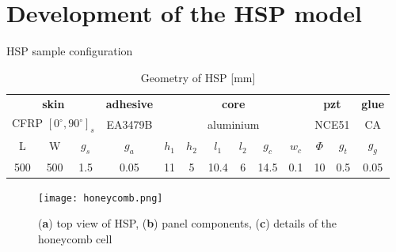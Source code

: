 \documentclass[10pt]{beamer} %
\begin{document}
\section{Development of the HSP model}
\begin{frame}[label=frame6]{HSP sample configuration}
\begin{table}
	\centering \footnotesize
	\caption{Geometry of HSP [mm]}
	\begin{tabular}{ccccccccccccc} 
		\toprule
		\multicolumn{3}{c}{\textbf{skin}} & {\textbf{adhesive}} & \multicolumn{6}{c}{\textbf{core}} & \multicolumn{2}{c}{\textbf{pzt}} & {\textbf{glue}}\\
		\multicolumn{3}{c}{CFRP $[0^\circ,90^\circ]_s$} & {EA3479B} & \multicolumn{6}{c}{aluminium} & \multicolumn{2}{c}{NCE51} & {CA}\\ 
		\cmidrule(lr){1-3} \cmidrule(lr){4-4} \cmidrule(lr){5-10} \cmidrule(lr){11-12} \cmidrule(lr){13-13}
		L & W & $g_s$ & $g_a$ & $h_1$ & $h_2$ & $l_1$ & $l_2$ & $g_c$ & $w_c$ & $\Phi$ & $g_t$ & $g_g$\\ 
		\cmidrule(lr){1-3} \cmidrule(lr){4-4} \cmidrule(lr){5-10} \cmidrule(lr){11-12} \cmidrule(lr){13-13}
		500 & 500 & 1.5 & 0.05 & 11 & 5 & 10.4 & 6 & 14.5 & 0.1 & 10 & 0.5 & 0.05\\
		\bottomrule 
	\end{tabular} 
	\label{tab:panel_geo}
\end{table}
\begin{figure}
\texttt{[image: honeycomb.png]}
\caption{(\textbf{a}) top view of HSP, (\textbf{b}) panel components, (\textbf{c}) details of the honeycomb cell}
\end{figure}
\end{frame}
\end{document}
